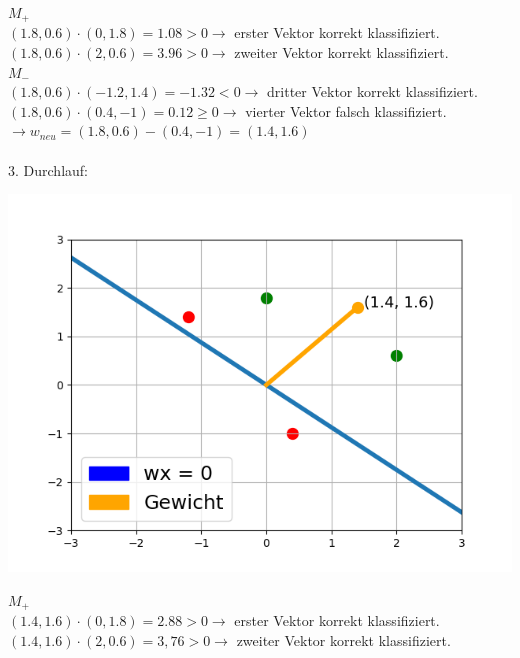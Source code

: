 \documentclass[a4paper]{scrartcl}
\newenvironment{Figure}
  {\par\medskip\noindent\minipage{\linewidth}}
  {\endminipage\par\medskip}
\begin{document}
\begin{multicols}{2}
                        $M_+$\\
                        $(1.8,0.6)\cdot (0,1.8) = 1.08 > 0 \rightarrow$ erster Vektor korrekt klassifiziert.\\
                        $(1.8,0.6)\cdot (2,0.6) = 3.96 > 0 \rightarrow$ zweiter Vektor korrekt klassifiziert.\\
                        $M_-$\\
                        $(1.8,0.6)\cdot (-1.2,1.4) = -1.32 < 0 \rightarrow$ dritter Vektor korrekt klassifiziert.\\
                        $(1.8,0.6)\cdot (0.4,-1) = 0.12 \geq 0 \rightarrow$ vierter Vektor falsch klassifiziert.\\
                        $\rightarrow w_{neu} = (1.8,0.6)-(0.4,-1) = (1.4,1.6)$\\
                        \\
                        3. Durchlauf:\\
                        \begin{Figure}
                            \centering 
                            \includegraphics[width=\linewidth]{bsp3.png}
                        \end{Figure}
                        $M_+$\\
                        $(1.4,1.6)\cdot (0,1.8) = 2.88 > 0 \rightarrow$ erster Vektor korrekt klassifiziert.\\
                        $(1.4,1.6)\cdot (2,0.6) = 3,76 > 0 \rightarrow$ zweiter Vektor korrekt klassifiziert.\\

\end{multicols}
\end{document}
